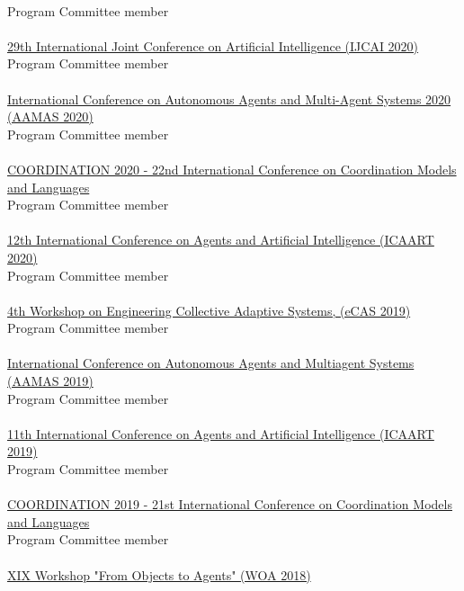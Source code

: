 \\ Program Committee member \\
\halfblankline \\
\href{https://https://ijcai20.org/}{29th International Joint Conference on Artificial Intelligence (IJCAI 2020)}
\\ Program Committee member \\
\halfblankline \\
\href{https://aamas2020.conference.auckland.ac.nz/program-committee-members/}{International Conference on Autonomous Agents and Multi-Agent Systems 2020 (AAMAS 2020)}
\\ Program Committee member \\
\halfblankline \\
\href{http://www.discotec.org/2020/coordination}{COORDINATION 2020 - 22nd International Conference on Coordination Models and Languages}
\\ Program Committee member \\
\halfblankline \\
\href{http://www.icaart.org/?y=2020}{12th International Conference on Agents and Artificial Intelligence 
(ICAART 2020)}
\\ Program Committee member \\
\halfblankline \\
\href{http://apice.unibo.it/xwiki/bin/view/ECAS2019/Committees}{4th Workshop on Engineering Collective Adaptive Systems, (eCAS 2019)}
\\ Program Committee member \\
\halfblankline \\
\href{http://aamas2019.encs.concordia.ca/}{International Conference on Autonomous Agents and 
Multiagent Systems (AAMAS 2019)}
\\ Program Committee member \\
\halfblankline \\
\href{http://www.icaart.org/?y=2019}{11th International Conference on Agents and Artificial Intelligence 
(ICAART 2019)}
\\ Program Committee member \\
\halfblankline \\
\href{http://www.discotec.org/2019/coordination}{COORDINATION 2019 - 21st International Conference on Coordination Models and Languages}
\\ Program Committee member \\
\halfblankline \\
\href{http://diid.unipa.it/roboticslab/woa2018/}{XIX Workshop "From Objects to Agents" (WOA 2018)}
